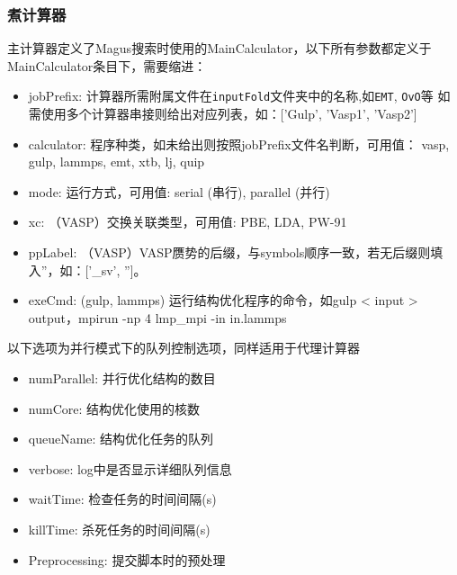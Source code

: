 \documentclass[12pt]{article}
\newcommand{\file}[1]{\texttt{#1}}
\begin{document}
\subsubsection{煮计算器}
主计算器定义了Magus搜索时使用的MainCalculator，以下所有参数都定义于MainCalculator条目下，需要缩进：
\begin{itemize}
    \item jobPrefix: 计算器所需附属文件在\file{inputFold}文件夹中的名称,如\file{EMT}, \file{OvO}等
    如需使用多个计算器串接则给出对应列表，如：['Gulp', 'Vasp1', 'Vasp2']\label{jobprefix}
    \item calculator: 程序种类，如未给出则按照jobPrefix文件名判断，可用值：
    {vasp, gulp, lammps, emt, xtb, lj, quip}
    \item mode: 运行方式，可用值: serial (串行), parallel (并行)
    \item xc: （VASP）交换关联类型，可用值: PBE, LDA, PW-91
    \item ppLabel: （VASP）VASP赝势的后缀，与symbols顺序一致，若无后缀则填入''，如：['\_sv', '']。
    \item exeCmd: (gulp, lammps) 运行结构优化程序的命令，如gulp < input > output，mpirun -np 4 lmp\_mpi -in in.lammps
\end{itemize}
以下选项为并行模式下的队列控制选项，同样适用于代理计算器
\begin{itemize}
    \item numParallel: 并行优化结构的数目
    \item numCore: 结构优化使用的核数
    \item queueName: 结构优化任务的队列
    \item verbose: log中是否显示详细队列信息
    \item waitTime: 检查任务的时间间隔(s)
    \item killTime: 杀死任务的时间间隔(s)
    \item Preprocessing: 提交脚本时的预处理
\end{itemize}
\end{document}
